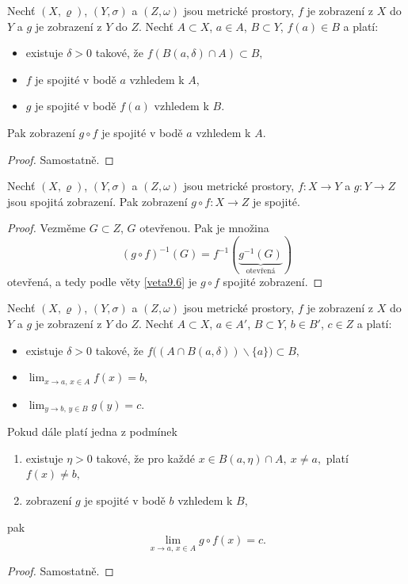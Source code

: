 \begin{veta}\label{veta9.8}
Nechť $(X,\varrho)$, $(Y,\sigma)$ a $(Z,\omega)$ jsou metrické prostory, $f$ je zobrazení z $X$ do $Y$ a $g$ je zobrazení z $Y$ do $Z$. Nechť $A\subset X$, $a\in A$, $B\subset Y$, $f(a)\in B$ a platí:
\begin{itemize}
    \item existuje $\delta>0$ takové, že
    $
    f(B(a,\delta)\cap A)\subset B,
    $

    \item $f$ je spojité v bodě $a$ vzhledem k $A$,

    \item $g$ je spojité v bodě $f(a)$ vzhledem k $B$.
\end{itemize}
Pak zobrazení $g\circ f$ je spojité v bodě $a$ vzhledem k $A$.
\end{veta}

\begin{proof}
	Samostatně.
\end{proof}

\begin{veta} \label{veta9.9}
Nechť $(X,\varrho)$, $(Y,\sigma)$ a $(Z,\omega)$ jsou metrické prostory, $f : X\to Y$ a $g : Y\to Z$ jsou spojitá zobrazení. Pak zobrazení
$
g\circ f : X\to Z
$
je spojité.
\end{veta}

\begin{proof}
	Vezměme $G \subset Z$, $G$ otevřenou. Pak je množina
	$$(g\circ f)^{-1}(G)=f^{-1}(\underbrace{g^{-1}(G)}_{\text{otevřená}})$$
	otevřená, a tedy podle věty \ref{veta9.6} je $g\circ f$ spojité zobrazení.
\end{proof}

\begin{veta}\label{veta9.10}
Nechť $(X,\varrho)$, $(Y,\sigma)$ a $(Z,\omega)$ jsou metrické prostory, $f$ je zobrazení z $X$ do $Y$ a $g$ je zobrazení z $Y$ do $Z$. Nechť $A\subset X$, $a\in A'$, $B\subset Y$, $b\in B'$, $c\in Z$ a platí:
\begin{itemize}
    \item existuje $\delta>0$ takové, že
    $
    f\bigl((A\cap B(a,\delta))\smallsetminus\{a\}\bigr)\subset B,
    $

    \item
    $
    \lim_{x\to a,\, x\in A} f(x)=b,
    $

    \item
    $
    \lim_{y\to b,\, y\in B} g(y)=c.
    $
\end{itemize}

Pokud dále platí jedna z podmínek
\begin{enumerate}
	\item[(P)] existuje $\eta>0$ takové, že pro každé $x\in B(a,\eta)\cap A,\ x\neq a,$ platí $f(x)\neq b,$
	\item[(S)] zobrazení $g$ je spojité v bodě $b$ vzhledem k $B$,
\end{enumerate}
pak
\[
\lim_{x\to a,\, x\in A} g\circ f(x)=c.
\]
\end{veta}

\begin{proof}
	Samostatně.
\end{proof}

